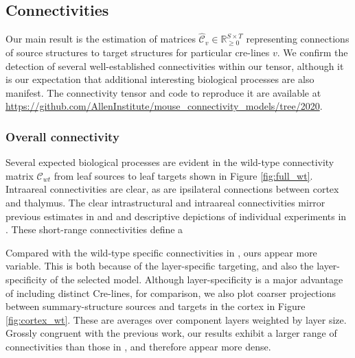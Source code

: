 \newpage

\subsection{Connectivities}

Our main result is the estimation of matrices $\hat {\mathcal C}_v \in \mathbb R_{\geq 0}^{S \times T}$ representing connections of source structures to target structures for particular cre-lines $v$. 
We confirm the detection of several well-established connectivities within our tensor, although it is our expectation that additional interesting biological processes are also manifest.
The connectivity tensor and code to reproduce it are available at \url{https://github.com/AllenInstitute/mouse_connectivity_models/tree/2020}.

\subsubsection{Overall connectivity}

Several expected biological processes are evident in the wild-type connectivity matrix $\mathcal C_{wt}$ from leaf sources to leaf targets shown in Figure \ref{fig:full_wt}.
Intraareal connectivities are clear, as are ipsilateral connections between cortex and thalymus.
The clear intrastructural and intraareal connectivities mirror previous estimates in \citet{Oh2014-kh} and \citet{Knox2019-ot} and descriptive depictions of individual experiments in \citet{Harris2019-mr}.
These short-range connectivities define a 

Compared with the wild-type specific connectivities in \citet{Knox2019-ot}, ours appear more variable.
This is both because of the layer-specific targeting, and also the layer-specificity of the selected model.
Although layer-specificity is a major advantage of including distinct Cre-lines, for comparison, we also plot coarser projections between summary-structure sources and targets in the cortex in Figure \ref{fig:cortex_wt}.
These are averages over component layers weighted by layer size.
Grossly congruent with the previous work, our results exhibit a larger range of connectivities than those in \citet{Knox2019-ot}, and therefore appear more dense.


\newpage

